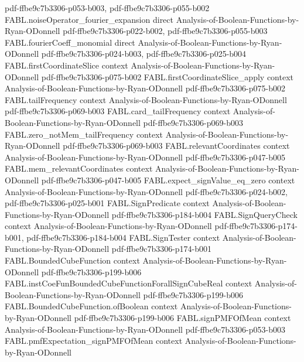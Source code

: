 \begin{theorem}
  {pdf-ffbe9c7b3306-p053-b003,
    pdf-ffbe9c7b3306-p055-b002}
\proofstep
  {FABL.noiseOperator_fourier_expansion}
  {direct}
  {Analysis-of-Boolean-Functions-by-Ryan-ODonnell}
  {pdf-ffbe9c7b3306-p022-b002,
    pdf-ffbe9c7b3306-p055-b003}
\proofstep
  {FABL.fourierCoeff_monomial}
  {direct}
  {Analysis-of-Boolean-Functions-by-Ryan-ODonnell}
  {pdf-ffbe9c7b3306-p024-b003,
    pdf-ffbe9c7b3306-p025-b004}
\proofstep
  {FABL.firstCoordinateSlice}
  {context}
  {Analysis-of-Boolean-Functions-by-Ryan-ODonnell}
  {pdf-ffbe9c7b3306-p075-b002}
\proofstep
  {FABL.firstCoordinateSlice_apply}
  {context}
  {Analysis-of-Boolean-Functions-by-Ryan-ODonnell}
  {pdf-ffbe9c7b3306-p075-b002}
\proofstep
  {FABL.tailFrequency}
  {context}
  {Analysis-of-Boolean-Functions-by-Ryan-ODonnell}
  {pdf-ffbe9c7b3306-p069-b003}
\proofstep
  {FABL.card_tailFrequency}
  {context}
  {Analysis-of-Boolean-Functions-by-Ryan-ODonnell}
  {pdf-ffbe9c7b3306-p069-b003}
\proofstep
  {FABL.zero_notMem_tailFrequency}
  {context}
  {Analysis-of-Boolean-Functions-by-Ryan-ODonnell}
  {pdf-ffbe9c7b3306-p069-b003}
\proofstep
  {FABL.relevantCoordinates}
  {context}
  {Analysis-of-Boolean-Functions-by-Ryan-ODonnell}
  {pdf-ffbe9c7b3306-p047-b005}
\proofstep
  {FABL.mem_relevantCoordinates}
  {context}
  {Analysis-of-Boolean-Functions-by-Ryan-ODonnell}
  {pdf-ffbe9c7b3306-p047-b005}
\proofstep
  {FABL.expect_signValue_eq_zero}
  {context}
  {Analysis-of-Boolean-Functions-by-Ryan-ODonnell}
  {pdf-ffbe9c7b3306-p024-b002,
    pdf-ffbe9c7b3306-p025-b001}
\proofstep
  {FABL.SignPredicate}
  {context}
  {Analysis-of-Boolean-Functions-by-Ryan-ODonnell}
  {pdf-ffbe9c7b3306-p184-b004}
\proofstep
  {FABL.SignQueryCheck}
  {context}
  {Analysis-of-Boolean-Functions-by-Ryan-ODonnell}
  {pdf-ffbe9c7b3306-p174-b001,
    pdf-ffbe9c7b3306-p184-b004}
\proofstep
  {FABL.SignTester}
  {context}
  {Analysis-of-Boolean-Functions-by-Ryan-ODonnell}
  {pdf-ffbe9c7b3306-p174-b001}
\proofstep
  {FABL.BoundedCubeFunction}
  {context}
  {Analysis-of-Boolean-Functions-by-Ryan-ODonnell}
  {pdf-ffbe9c7b3306-p199-b006}
\proofstep
  {FABL.instCoeFunBoundedCubeFunctionForallSignCubeReal}
  {context}
  {Analysis-of-Boolean-Functions-by-Ryan-ODonnell}
  {pdf-ffbe9c7b3306-p199-b006}
\proofstep
  {FABL.BoundedCubeFunction.ofBoolean}
  {context}
  {Analysis-of-Boolean-Functions-by-Ryan-ODonnell}
  {pdf-ffbe9c7b3306-p199-b006}
\proofstep
  {FABL.signPMFOfMean}
  {context}
  {Analysis-of-Boolean-Functions-by-Ryan-ODonnell}
  {pdf-ffbe9c7b3306-p053-b003}
\proofstep
  {FABL.pmfExpectation_signPMFOfMean}
  {context}
  {Analysis-of-Boolean-Functions-by-Ryan-ODonnell}

\end{theorem}
